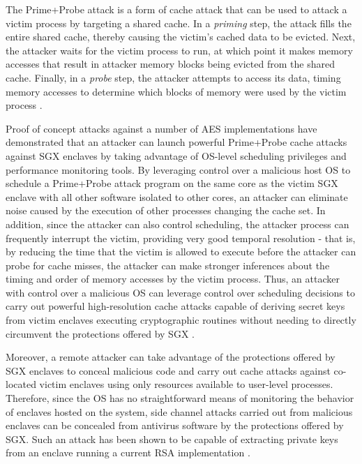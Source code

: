 The Prime+Probe attack is a form of cache attack that can be used to attack a victim process by targeting a shared cache. In a \emph{priming} step, the attack fills the entire shared cache, thereby causing the victim's cached data to be evicted. Next, the attacker waits for the victim process to run, at which point it makes memory accesses that result in attacker memory blocks being evicted from the shared cache. Finally, in a \emph{probe} step, the attacker attempts to access its data, timing memory accesses to determine which blocks of memory were used by the victim process \cite{moghimi_cachezoom:_2017, gotzfried_cache_2017}.

Proof of concept attacks against a number of AES implementations have demonstrated that an attacker can launch powerful Prime+Probe cache attacks against SGX enclaves by taking advantage of OS-level scheduling privileges and performance monitoring tools. By leveraging control over a malicious host OS to schedule a Prime\-+Probe attack program on the same core as the victim SGX enclave with all other software isolated to other cores, an attacker can eliminate noise caused by the execution of other processes changing the cache set. In addition, since the attacker can also control scheduling, the attacker process can frequently interrupt the victim, providing very good temporal resolution - that is, by reducing the time that the victim is allowed to execute before the attacker can probe for cache misses, the attacker can make stronger inferences about the timing and order of memory accesses by the victim process. Thus, an attacker with control over a malicious OS can leverage control over scheduling decisions to carry out powerful high-resolution cache attacks capable of deriving secret keys from victim enclaves executing cryptographic routines without needing to directly circumvent the protections offered by SGX \cite{moghimi_cachezoom:_2017, gotzfried_cache_2017}.

Moreover, a remote attacker can take advantage of the protections offered by SGX enclaves to conceal malicious code and carry out cache attacks against co-located victim enclaves using only resources available to user-level processes. Therefore, since the OS has no straightforward means of monitoring the behavior of enclaves hosted on the system, side channel attacks carried out from malicious enclaves can be concealed from antivirus software by the protections offered by SGX. Such an attack has been shown to be capable of extracting private keys from an enclave running a current RSA implementation \cite{schwarz_malware_2017}.

